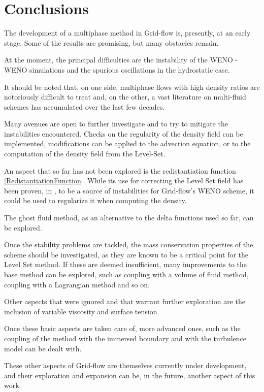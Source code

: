 \documentclass[11pt, a4paper, oneside, openany]{book}
\begin{document}
\chapter{Conclusions}\label{Chapter_Conclusions_and_Future_Work}
The development of a multiphase method in Grid-flow is, presently, at an early stage. Some of the results are promising, but many obstacles remain.\par
At the moment, the principal difficulties are the instability of the WENO - WENO simulations and the spurious oscillations in the hydrostatic case.\par
It should be noted that, on one side, multiphase flows with high density ratios are notoriously difficult to treat and, on the other, a vast literature on multi-fluid schemes has accumulated over the last few decades.\par 
Many avenues are open to further investigate and to try to mitigate the instabilities encountered. Checks on the regularity of the density field can be implemented, modifications can be applied to the advection equation, or to the computation of the density field from the Level-Set.\par
An aspect that so far has not been explored is the redistantiation function \eqref{RedistantiationFunction}. While its use for correcting the Level Set field has been proven, in \cite{Bardin2015}, to be a source of instabilities for Grid-flow's WENO scheme, it could be used to regularize it when computing the density.\par
The ghost fluid method, as an alternative to the delta functions used so far, can be explored.\par
Once the stability problems are tackled, the mass conservation properties of the scheme should be investigated, as they are known to be a critical point for the Level Set method. If these are deemed insufficient, many improvements to the base method can be explored, such as coupling with a volume of fluid method, coupling with a Lagrangian method and so on.\par
Other aspects that were ignored and that warrant further exploration are the inclusion of variable viscosity and surface tension.\par
Once these basic aspects are taken care of, more advanced ones, such as the coupling of the method with the immersed boundary and with the turbulence model can be dealt with.\par
These other aspects of Grid-flow are themselves currently under development, and their exploration and expansion can be, in the future, another aspect of this work.

\backmatter
{}

\nocite{*}

\end{document}
